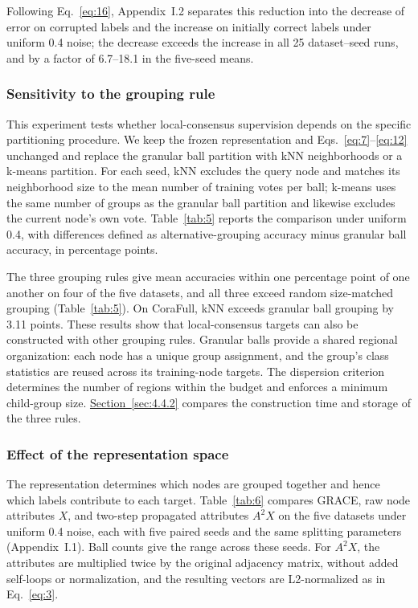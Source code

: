 \documentclass[10pt,letterpaper,nopreprintline]{elsarticle}
\theoremstyle{plain}
\begin{document}
Following Eq.~\eqref{eq:16}, Appendix~I.2 separates this reduction into the decrease of error on corrupted labels and the increase on initially correct labels under uniform 0.4 noise; the decrease exceeds the increase in all 25 dataset--seed runs, and by a factor of 6.7--18.1 in the five-seed means.

\subsubsection{Sensitivity to the grouping rule}\label{sec:4.3.2}

This experiment tests whether local-consensus supervision depends on the specific partitioning procedure. We keep the frozen representation and Eqs.~\eqref{eq:7}--\eqref{eq:12} unchanged and replace the granular ball partition with kNN neighborhoods or a k-means partition. For each seed, kNN excludes the query node and matches its neighborhood size to the mean number of training votes per ball; k-means uses the same number of groups as the granular ball partition and likewise excludes the current node's own vote. Table~\ref{tab:5} reports the comparison under uniform 0.4, with differences defined as alternative-grouping accuracy minus granular ball accuracy, in percentage points.



The three grouping rules give mean accuracies within one percentage point of one another on four of the five datasets, and all three exceed random size-matched grouping (Table~\ref{tab:5}). On CoraFull, kNN exceeds granular ball grouping by 3.11 points. These results show that local-consensus targets can also be constructed with other grouping rules. Granular balls provide a shared regional organization: each node has a unique group assignment, and the group's class statistics are reused across its training-node targets. The dispersion criterion determines the number of regions within the budget and enforces a minimum child-group size. \hyperref[sec:4.4.2]{Section~\ref*{sec:4.4.2}} compares the construction time and storage of the three rules.

\subsubsection{Effect of the representation space}\label{sec:4.3.3}

The representation determines which nodes are grouped together and hence which labels contribute to each target. Table~\ref{tab:6} compares GRACE, raw node attributes \(X\), and two-step propagated attributes \(A^2X\) on the five datasets under uniform 0.4 noise, each with five paired seeds and the same splitting parameters (Appendix~I.1). Ball counts give the range across these seeds. For \(A^2X\), the attributes are multiplied twice by the original adjacency matrix, without added self-loops or normalization, and the resulting vectors are L2-normalized as in Eq.~\eqref{eq:3}.
\end{document}
